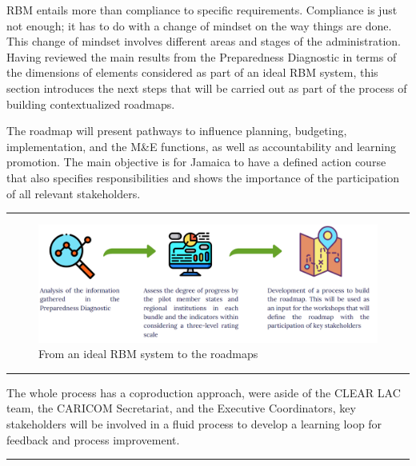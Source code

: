 \documentclass[
  10pt,
]{book}
\begin{document}
RBM entails more than compliance to specific requirements. Compliance is just not enough; it has to do with a change of mindset on the way things are done. This change of mindset involves different areas and stages of the administration. Having reviewed the main results from the Preparedness Diagnostic in terms of the dimensions of elements considered as part of an ideal RBM system, this section introduces the next steps that will be carried out as part of the process of building contextualized roadmaps.

The roadmap will present pathways to influence planning, budgeting, implementation, and the M\&E functions, as well as accountability and learning promotion. The main objective is for Jamaica to have a defined action course that also specifies responsibilities and shows the importance of the participation of all relevant stakeholders.

\begin{center}\rule{0.5\linewidth}{0.5pt}\end{center}

\begin{figure}

{\centering \includegraphics[width=1\linewidth]{./images/figure_6} 

}

\caption{From an ideal RBM system to the roadmaps}\label{fig:figure6}
\end{figure}

\begin{center}\rule{0.5\linewidth}{0.5pt}\end{center}

The whole process has a coproduction approach, were aside of the CLEAR LAC team, the CARICOM Secretariat, and the Executive Coordinators, key stakeholders will be involved in a fluid process to develop a learning loop for feedback and process improvement.

\begin{center}\rule{0.5\linewidth}{0.5pt}\end{center}
\end{document}
